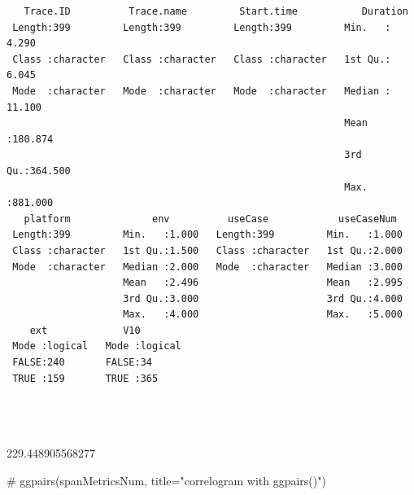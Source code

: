 \documentclass[
  letterpaper,
  DIV=11,
  numbers=noendperiod]{scrartcl}
\newenvironment{Shaded}{\begin{snugshade}}{\end{snugshade}}
\newcommand{\CommentTok}[1]{\textcolor[rgb]{0.37,0.37,0.37}{#1}}
\begin{document}
\begin{verbatim}
   Trace.ID          Trace.name         Start.time           Duration      
 Length:399         Length:399         Length:399         Min.   :  4.290  
 Class :character   Class :character   Class :character   1st Qu.:  6.045  
 Mode  :character   Mode  :character   Mode  :character   Median : 11.100  
                                                          Mean   :180.874  
                                                          3rd Qu.:364.500  
                                                          Max.   :881.000  
   platform              env          useCase            useCaseNum   
 Length:399         Min.   :1.000   Length:399         Min.   :1.000  
 Class :character   1st Qu.:1.500   Class :character   1st Qu.:2.000  
 Mode  :character   Median :2.000   Mode  :character   Median :3.000  
                    Mean   :2.496                      Mean   :2.995  
                    3rd Qu.:3.000                      3rd Qu.:4.000  
                    Max.   :4.000                      Max.   :5.000  
    ext             V10         
 Mode :logical   Mode :logical  
 FALSE:240       FALSE:34       
 TRUE :159       TRUE :365      
                                
                                
                                
\end{verbatim}

229.448905568277

\begin{Shaded}
\end{Shaded}

\begin{Shaded}
\begin{Highlighting}[]
\CommentTok{\# ggpairs(spanMetricsNum, title="correlogram with ggpairs()")}
\end{Highlighting}
\end{Shaded}
\end{document}
